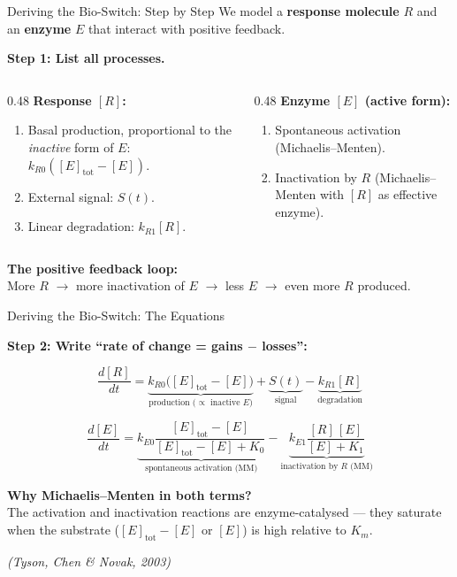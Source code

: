 \begin{frame}{Deriving the Bio-Switch: Step by Step}
We model a \textbf{response molecule} $R$ and an \textbf{enzyme} $E$ that interact with positive feedback.

\vspace{0.2cm}
\textbf{Step 1: List all processes.}

\begin{columns}[T]
\begin{column}{0.48\textwidth}
\textbf{Response $[R]$:}
\begin{enumerate}
    \item[\textcolor{green!60!black}{$+$}] Basal production, proportional to the \emph{inactive} form of $E$: $k_{R0}([E]_{\text{tot}} - [E])$.
    \item[\textcolor{green!60!black}{$+$}] External signal: $S(t)$.
    \item[\textcolor{red}{$-$}] Linear degradation: $k_{R1}[R]$.
\end{enumerate}
\end{column}
\begin{column}{0.48\textwidth}
\textbf{Enzyme $[E]$ (active form):}
\begin{enumerate}
    \item[\textcolor{green!60!black}{$+$}] Spontaneous activation (Michaelis--Menten).
    \item[\textcolor{red}{$-$}] Inactivation by $R$ (Michaelis--Menten with $[R]$ as effective enzyme).
\end{enumerate}
\end{column}
\end{columns}

\vspace{0.3cm}
\textbf{The positive feedback loop:} \\
More $R$ $\to$ more inactivation of $E$ $\to$ less $E$ $\to$ even more $R$ produced.
\end{frame}


\begin{frame}{Deriving the Bio-Switch: The Equations}

\textbf{Step 2: Write ``rate of change = gains $-$ losses'':}

\[
\boxed{\frac{d[R]}{dt} = \underbrace{k_{R0}\bigl([E]_{\text{tot}} - [E]\bigr)}_{\text{production (}\propto\text{ inactive } E\text{)}} + \underbrace{S(t)}_{\text{signal}} - \underbrace{k_{R1}[R]}_{\text{degradation}}}
\]

\[
\boxed{\frac{d[E]}{dt} = \underbrace{k_{E0}\frac{[E]_{\text{tot}} - [E]}{[E]_{\text{tot}} - [E] + K_0}}_{\text{spontaneous activation (MM)}}
    - \underbrace{k_{E1}\frac{[R]\,[E]}{[E] + K_1}}_{\text{inactivation by } R \text{ (MM)}}}
\]

\vspace{0.3cm}
\textbf{Why Michaelis--Menten in both terms?} \\
The activation and inactivation reactions are enzyme-catalysed --- they saturate when the substrate ($[E]_{\text{tot}} - [E]$ or $[E]$) is high relative to $K_m$.

\vspace{0.2cm}
\textit{(Tyson, Chen \& Novak, 2003)}
\end{frame}


